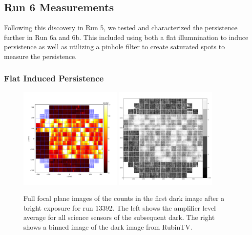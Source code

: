 \documentclass[DM,authoryear,toc]{lsstdoc}
\begin{document}
\subsection{Run 6 Measurements}
Following this discovery in Run 5, we tested and characterized the persistence further in Run 6a and 6b. 
This included using both a flat illumnination to induce persistence as well as utilizing a pinhole filter to create saturated spots to measure the persistence.

\subsubsection{Flat Induced Persistence}
\begin{figure}[!htp]
  \centering
  \includegraphics[width=0.45\textwidth, angle=0]{Run_13392_Persistence.png}
  \includegraphics[width=0.45\textwidth, angle=0]{Persistence_Flat_Example.png}
  \caption{
  Full focal plane images of the counts in the first dark image after a bright exposure for run 13392.
  The left shows the amplifier level average for all science sensors of the subsequent dark.
  The right shows a binned image of the dark image from RubinTV.
  }\label{fig:Flat_Induced}
\end{figure}
\end{document}
